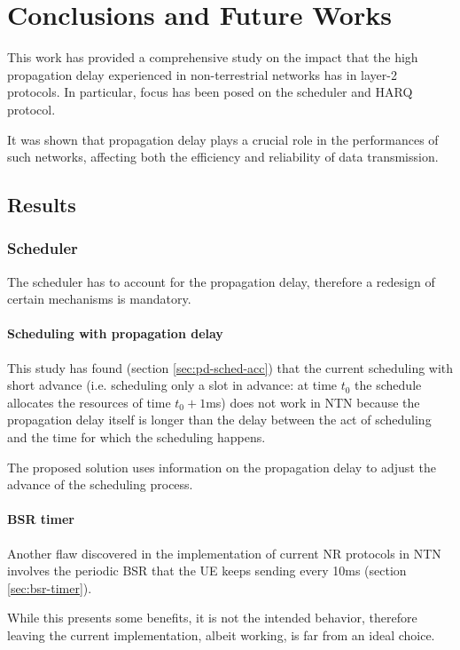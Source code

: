 
\chapter{Conclusions and Future Works}
\label{chp:conclusions}

This work has provided a comprehensive study on the impact that the high propagation delay experienced in non-terrestrial networks has in layer-2 protocols. In particular, focus has been posed on the scheduler and \ac{HARQ} protocol.

It was shown that propagation delay plays a crucial role in the performances of such networks, affecting both the efficiency and reliability of data transmission.

\section{Results}
\subsection{Scheduler}
The scheduler has to account for the propagation delay, therefore a redesign of certain mechanisms is mandatory.

\subsubsection{Scheduling with propagation delay}
This study has found (section \ref{sec:pd-sched-acc}) that the current scheduling with short advance (i.e. scheduling only a slot in advance: at time $t_0$ the schedule allocates the resources of time $t_0+1$ms) does not work in \ac{NTN} because the propagation delay itself is longer than the delay between the act of scheduling and the time for which the scheduling happens. 

The proposed solution uses information on the propagation delay to adjust the advance of the scheduling process. 

\subsubsection{BSR timer}

Another flaw discovered in the implementation of current \ac{NR} protocols in \ac{NTN} involves the periodic \ac{BSR} that the \ac{UE} keeps sending every 10ms (section \ref{sec:bsr-timer}). 

While this presents some benefits, it is not the intended behavior, therefore leaving the current implementation, albeit working, is far from an ideal choice.

